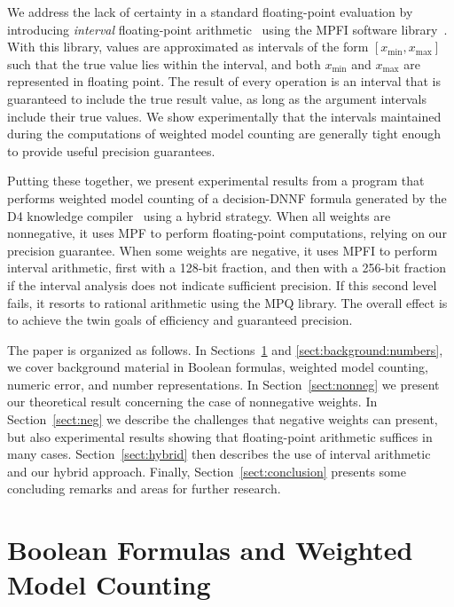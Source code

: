 \documentclass[letterpaper,USenglish,cleveref, autoref, thm-restate]{lipics-v2021}
\newcommand{\xmin}{x_{\textrm{min}}}
\newcommand{\xmax}{x_{\textrm{max}}}
\begin{document}
We address the lack of certainty in a standard floating-point
evaluation by introducing \emph{interval} floating-point arithmetic~\cite{hickey:jacm:2001}
using the MPFI software library~\cite{revol:rc:2005}. With this
library, values are approximated as intervals of the form $[\xmin,  \xmax]$ such that the true value lies within the interval, and both
$\xmin$ and $\xmax$ are represented in floating point.  The result of
every operation is an interval that is guaranteed to include the true
result value, as long as the argument intervals include their true
values.  We show experimentally that the intervals maintained during
the computations of weighted model counting are generally tight enough
to provide useful precision guarantees.

Putting these together, we present experimental results from a program
that performs weighted model counting of a decision-DNNF formula
generated by the D4 knowledge compiler~\cite{lagniez:ijcai:2017} using
a hybrid strategy.  When all weights are nonnegative, it uses MPF to
perform floating-point computations, relying on our precision
guarantee.  When some weights are negative, it uses MPFI to perform
interval arithmetic, first with a 128-bit fraction, and then with a
256-bit fraction if the interval analysis does not indicate sufficient
precision.  If this second level fails, it resorts to rational
arithmetic using the MPQ library.  The overall effect is to achieve
the twin goals of efficiency and guaranteed precision.

The paper is organized as follows.  In
Sections~\ref{sect:background:boolean} and
\ref{sect:background:numbers}, we cover background material in Boolean
formulas, weighted model counting, numeric error, and number
representations.  In Section~\ref{sect:nonneg} we present our
theoretical result concerning the case of nonnegative weights.  In
Section~\ref{sect:neg} we describe the challenges that negative
weights can present, but also experimental results showing that
floating-point arithmetic suffices in many cases.
Section~\ref{sect:hybrid} then describes the use of interval
arithmetic and our hybrid approach.  
Finally, Section~\ref{sect:conclusion}
presents some concluding remarks and  areas for
further research.


\section{Boolean Formulas and Weighted Model Counting}
\label{sect:background:boolean}
\end{document}
